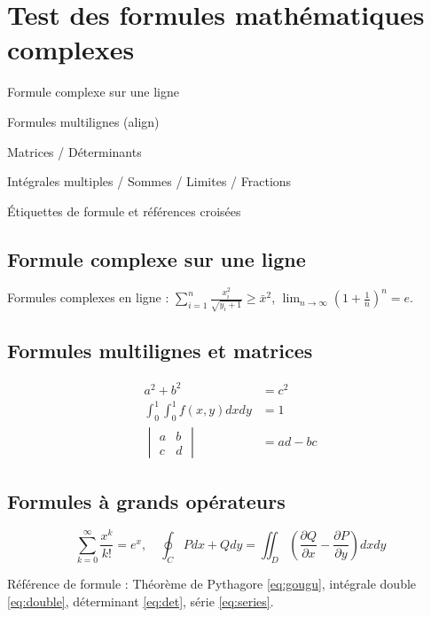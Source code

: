 \documentclass[fr]{../../elegantbook}
\begin{document}
\chapter{Test des formules mathématiques complexes}
\begin{introduction}
\item Formule complexe sur une ligne
\item Formules multilignes (align)
\item Matrices / Déterminants
\item Intégrales multiples / Sommes / Limites / Fractions
\item Étiquettes de formule et références croisées
\end{introduction}

\section{Formule complexe sur une ligne}
Formules complexes en ligne : $\sum_{i=1}^n \frac{x_i^2}{\sqrt{y_i+1}} \geq \bar{x}^2$, $\lim_{n\to\infty} \left(1+\frac{1}{n}\right)^n = e$.

\section{Formules multilignes et matrices}
\begin{align}
a^2 + b^2 &= c^2 \label{eq:gougu} \\
\int_{0}^{1}\int_{0}^{1} f(x,y) dxdy &= 1 \label{eq:double} \\
\begin{vmatrix}
a & b \\
c & d
\end{vmatrix} &= ad-bc \label{eq:det}
\end{align}

\section{Formules à grands opérateurs}
\begin{equation}\label{eq:series}
\sum_{k=0}^{\infty} \frac{x^k}{k!} = e^x,\quad \oint_{C} Pdx+Qdy = \iint_{D}\left(\frac{\partial Q}{\partial x}-\frac{\partial P}{\partial y}\right)dxdy
\end{equation}

Référence de formule : Théorème de Pythagore \eqref{eq:gougu}, intégrale double \eqref{eq:double}, déterminant \eqref{eq:det}, série \eqref{eq:series}.
\end{document}
